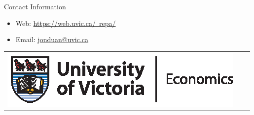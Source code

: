 \documentclass[final]{beamer}
\newlength{\onecolwid}
\begin{document}
\begin{frame}[t]
\begin{columns}[t]
\begin{column}{\onecolwid}

\begin{alertblock}{Contact Information}

\begin{itemize}
\item Web: \href{https://web.uvic.ca/~repa/}{https://web.uvic.ca/~repa/}
\item Email: \href{mailto:jonduan@uvic.ca}{jonduan@uvic.ca}
\end{itemize}

\end{alertblock}

\begin{center}
\begin{tabular}{ccc}
\includegraphics[width=0.9\linewidth]{ECON_comb_h_4c.eps} %
\end{tabular}
\end{center}


\end{column} %

\end{columns} %

\end{frame} %
\end{document}
